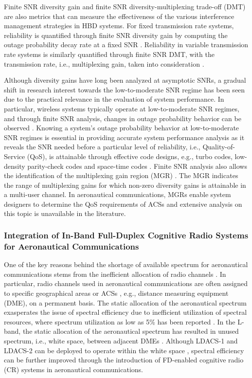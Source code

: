 Finite SNR diversity gain and finite SNR diversity-multiplexing trade-off (DMT) are also metrics that can measure the effectiveness of the various interference management strategies in HBD systems. For fixed transmission rate systems, reliability is quantified through finite SNR diversity gain by computing the outage probability decay rate at a fixed SNR \cite{shin2008diversity}. Reliability in variable transmission rate systems is similarly quantified through finite SNR DMT, with the transmission rate, i.e., multiplexing gain, taken into consideration \cite{narasimhan2006finite}. 

Although diversity gains have long been analyzed at asymptotic SNRs, a gradual shift in research interest towards the low-to-moderate SNR regime has been seen due to the practical relevance in the evaluation of system performance. In particular, wireless systems typically operate at low-to-moderate SNR regimes, and through finite SNR analysis, changes in outage probability behavior can be observed \cite{shin2008diversity}. Knowing a system's outage probability behavior at low-to-moderate SNR regimes is essential in providing accurate system performance analysis as it reveals the SNR needed before a particular level of reliability, i.e., Quality-of-Service (QoS), is attainable through effective code designs, e.g., turbo codes, low-density parity-check codes and space-time codes \cite{narasimhan2006finite}. Finite SNR analysis also allows the identification of the multiplexing gain region (MGR) \cite{karmakar2012generalized}. The MGR indicates the range of multiplexing gains for which non-zero diversity gains is attainable in a multi-user channel. In aeronautical communications, MGRs enable system designers to determine the QoS requirements of ACSs and extensive analysis on this topic is unavailable in the literature.

\subsubsection{Integration of In-Band Full-Duplex Cognitive Radio Systems for Aeronautical Communications}

One of the key reasons behind the shortage of available spectrum for aeronautical communications stems from the inefficient allocation of radio channels \cite{jacob2016cognitive}. In particular, radio channels used in aeronautical communications are often assigned to specific geographical areas \cite{jacob2016cognitive} or ACSs \cite{jamal2017fbmc}, e.g., distance measuring equipment (DME), on a permanent basis. The static allocation of the aeronautical spectrum exasperates the issue of spectral efficiency due to inefficient utilization of spectral resources, where spectrum utilization as low as 5\% has been reported \cite{jacob2016cognitive}. In the L-band, the static allocation of the aeronautical spectrum has resulted in unused spectrum, i.e., white space, between adjacent DMEs \cite{jamal2017fbmc}. Although LDACS-1 and LDACS-2 can be deployed to operate within the white space \cite{schnell2014ldacs,jamal2017fbmc}, spectral efficiency can be further improved through the introduction of FD-enabled cognitive radio (CR) systems in aeronautical communications.  

